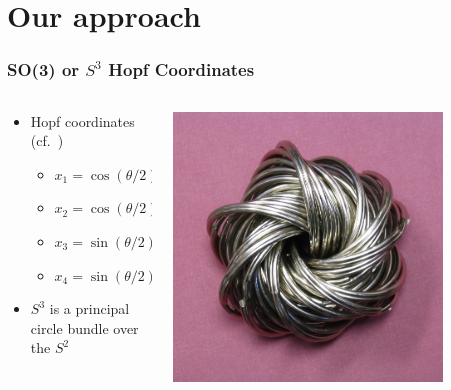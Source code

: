 \documentclass[serif]{beamer} %
\begin{document}
\section{Our approach}
\begin{frame}
  \frametitle{SO(3) or $S^3$ Hopf Coordinates}
\begin{columns}
\begin{column}{0.6\textwidth}
  \begin{itemize}
    \item Hopf coordinates (cf.~\cite{yershova2010generating})
    \begin{itemize}
      \item $x_1 = \cos(\theta/2) \cos(\psi/2)$
      \item $x_2 = \cos(\theta/2) \sin(\psi/2)$
      \item $x_3 = \sin(\theta/2) \cos(\varphi + \psi/2)$
      \item $x_4 = \sin(\theta/2) \sin(\varphi + \psi/2)$
    \end{itemize}
    \item $S^3$ is a principal circle bundle over the $S^2$
  \end{itemize}
\end{column}
\begin{column}{0.4\textwidth}
  \centerline{\includegraphics[width=0.8\textwidth]{Hopfkeyrings.jpg}}
\end{column}
\end{columns}
\end{frame}
\end{document}
